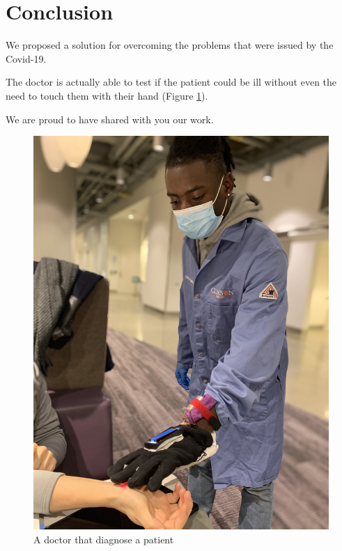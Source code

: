 \section{Conclusion}
We proposed a solution for overcoming the problems that were issued by the Covid-19.

The doctor is actually able to test if the patient could be ill without even the need to touch them with their hand (Figure \ref{fig:doctor}).

We are proud to have shared with you our work.

\begin{figure}[t]
    \centering
    \includegraphics[width=\linewidth]{resources/doctor-diagnosis.jpg}
    \caption{A doctor that diagnose a patient}
    \label{fig:doctor}
\end{figure}